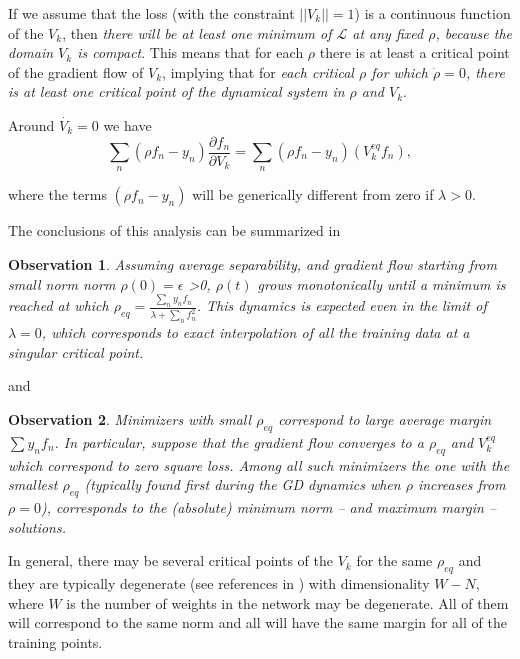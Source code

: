 \documentclass[11pt]{article}
\newtheorem{observation}{Observation}
\begin{document}
          
        If we assume that the loss (with the constraint
        $||V_k||=1$) is a continuous function of the $V_k$, then {\it there
        will be at least one minimum of $\mathcal{L}$ at any fixed $\rho$, because the
        domain $V_k$ is compact}. This means that for each $\rho$ there
        is at least a critical point of the gradient flow of $V_k$, implying that for {\it
          each critical $\rho$ for which $\dot{\rho}=0$, there is at
          least one 
          critical point of the dynamical system in $\rho$ and $V_k$}.


Around $\dot{V_k}=0$  we have
\begin{equation} 
 \sum_n  (\rho f_n - y_n)  {\frac{\partial f_n}{\partial V_k }}
 =\sum_n  (\rho f_n - y_n) (V^{eq}_k f_n),
\label{V-GD3}
\end{equation}

\noindent where the terms $ (\rho f_n - y_n)$ will be generically
different from zero if $\lambda>0$.



The conclusions of this analysis can be summarized in 

\begin{observation}
  Assuming {\it average separability}, and gradient flow starting from
  small norm norm 
  $\rho(0)=\epsilon$ >0, $\rho(t)$ grows monotonically until a minimum is reached at
  which $\rho_{eq}=\frac{\sum_n y_nf_n} {\lambda +\sum_n f^2_n}.$ This
  dynamics is expected  even in the limit of $\lambda=0$, which corresponds to
  exact interpolation of all the training data at a singular critical point.
\end{observation}


  and

  
\begin{observation}
  Minimizers with small $\rho_{eq}$ correspond to large average margin
  $\sum y_n f_n$. In particular, suppose that the gradient flow converges to a
  $\rho_{eq}$ and $V_k^{eq}$ which correspond to zero square
  loss. Among all such minimizers the one with the  smallest
  $\rho_{eq}$ (typically found first during the GD dynamics when
  $\rho$ increases from $\rho=0$),
  corresponds to the (absolute) minimum norm -- and maximum margin --
  solutions.  
\end{observation}


In general, there may be several critical points of the $V_k$ for the
same $\rho_{eq}$ and they are typically degenerate (see references in
\cite{PoggioCooper2020}) with dimensionality $W-N$, where $W$ is the
number of weights in the network may be degenerate. All of them will
correspond to the same norm and all will have the same margin for all
of the training points.
\end{document}
